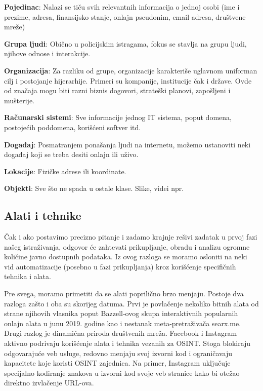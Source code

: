 \documentclass[a4paper, 11pt]{article}
\begin{document}
{\bf Pojedinac}: Nalazi se tiču svih relevantnih informacija o jednoj osobi (ime i prezime, adresa, finansijsko stanje, onlajn pseudonim, email adresa, društvene mreže)\newline

{\bf Grupa ljudi}: Obično u policijskim istragama, fokus se stavlja na grupu ljudi, njihove odnose i interakcije.\newline

{\bf Organizacija}: Za razliku od grupe, organizacije karakteriše uglavnom uniforman cilj i postojanje hijerarhije. Primeri su kompanije, institucije čak i države. Ovde od značaja mogu biti razni biznis dogovori, strateški planovi, zapošljeni i mušterije.\newline

{\bf Računarski sistemi}: Sve informacije jednog IT sistema, poput domena, postojećih  poddomena, korišćeni softver itd.\newline

{\bf Događaj}: Posmatranjem ponašanja ljudi na internetu, možemo ustanoviti neki događaj koji se treba desiti onlajn ili uživo.\newline

{\bf Lokacije}: Fizičke adrese ili koordinate.\newline

{\bf Objekti}: Sve što ne spada u ostale klase. Slike, videi npr.
\subsection{Alati i tehnike}
Čak i ako postavimo precizno pitanje i zadamo krajnje rešivi zadatak u prvoj fazi našeg istraživanja, odgovor će zahtevati prikupljanje, obradu i analizu ogromne količine javno dostupnih podataka. Iz ovog razloga se moramo osloniti na neki vid automatizacije (posebno u fazi prikupljanja) kroz korišćenje specifičnih tehnika i alata.\newline

Pre svega, moramo primetiti da se alati poprilično brzo menjaju. Postoje dva razloga zašto i oba su skorijeg datuma. Prvi je povlačenje nekoliko bitnih alata od strane njihovih vlasnika poput Bazzell-ovog skupa interaktivnih popularnih onlajn alata u junu 2019. godine kao i nestanak meta-pretraživača searx.me. Drugi razlog je dinamična priroda društvenih mreža. Facebook i Instagram aktivno podrivaju korišćenje alata i tehnika vezanih za OSINT. Stoga blokiraju odgovarajuće veb usluge, redovno menjaju svoj izvorni kod i ograničavaju kapacitete koje koristi OSINT zajednica. Na primer, Instagram uključuje specijalno kodiranje znakova u izvorni kod svoje veb stranice kako bi otežao direktno izvlačenje URL-ova.\newline
\end{document}
